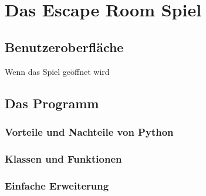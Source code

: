 \section{Das Escape Room Spiel}

\subsection{Benutzeroberfläche}
Wenn das Spiel geöffnet wird

\subsection{Das Programm}

\subsubsection{Vorteile und Nachteile von Python}

\subsubsection{Klassen und Funktionen}

\subsubsection{Einfache Erweiterung}
